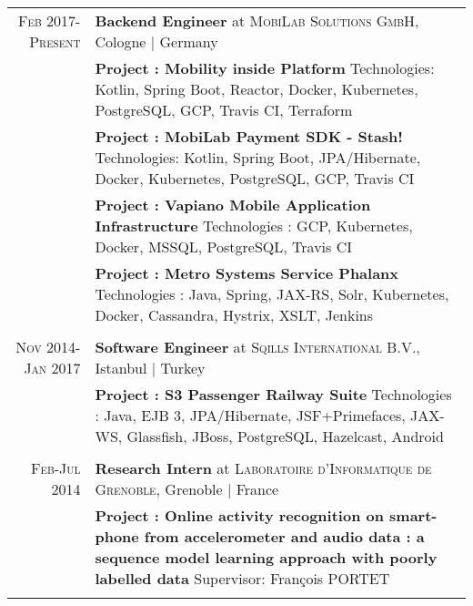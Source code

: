 \documentclass[a4paper,10pt]{article} %
\begin{document}
\begin{tabular}{r|p{13cm}}

\textsc{Feb 2017-Present} & \textbf{Backend Engineer} at \textsc{MobiLab Solutions GmbH}, Cologne | Germany \emph{}\\
& \footnotesize{\textbf{Project : Mobility inside Platform}
\newline
Technologies: Kotlin, Spring Boot, Reactor, Docker, Kubernetes, PostgreSQL, GCP, Travis CI, Terraform
}\\
& \footnotesize{\textbf{Project : MobiLab Payment SDK - Stash!}
\newline
Technologies: Kotlin, Spring Boot, JPA/Hibernate, Docker, Kubernetes, PostgreSQL, GCP, Travis CI 
}\\
& \footnotesize{\textbf{Project : Vapiano Mobile Application Infrastructure}
\newline
Technologies : GCP, Kubernetes, Docker, MSSQL, PostgreSQL, Travis CI  
}\\
& \footnotesize{\textbf{Project : Metro Systems Service Phalanx}
\newline
Technologies : Java, Spring, JAX-RS, Solr, Kubernetes, Docker, Cassandra, Hystrix, XSLT, Jenkins 
}\\
\multicolumn{2}{c}{} \\

\textsc{Nov 2014-Jan 2017} & \textbf{Software Engineer} at \textsc{Sqills International B.V.}, Istanbul | Turkey \emph{}\\
& \footnotesize{\textbf{Project : S3 Passenger Railway Suite}
\newline
Technologies : Java, EJB 3, JPA/Hibernate, JSF+Primefaces, JAX-WS, Glassfish, JBoss, PostgreSQL, Hazelcast, Android
}\\
\multicolumn{2}{c}{} \\


\textsc{Feb-Jul 2014} & \textbf{Research Intern} at \textsc{Laboratoire d'Informatique de Grenoble}, Grenoble | France \emph{}\\
& \footnotesize{\textbf{Project : Online activity recognition on smart-phone from accelerometer and audio data : a sequence model learning approach with poorly labelled data}
\newline
Supervisor: François PORTET
}\\
\multicolumn{2}{c}{} \\

\end{tabular}

\end{document}
